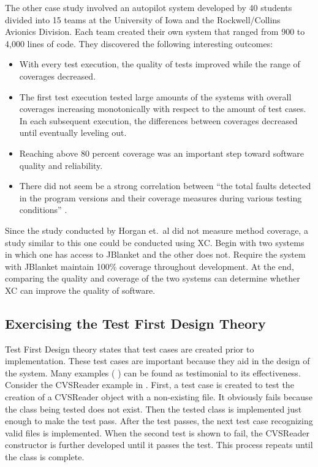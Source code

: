 The other case study involved an autopilot system developed by 40 students
divided into 15 teams at the University of Iowa and the Rockwell/Collins
Avionics Division.  Each team created their own system that ranged from 900
to 4,000 lines of code.  They discovered the following interesting
outcomes:
\begin{itemize}
\item With every test execution, the quality of tests improved while
the range of coverages decreased.
\item The first test execution tested large amounts of the systems
with overall coverages increasing monotonically with respect to the
amount of test cases.  In each subsequent execution, the differences
between coverages decreased until eventually leveling out.
\item Reaching above 80 percent coverage was an important step toward
software quality and reliability.
\item There did not seem be a strong correlation between ``the total
faults detected in the program versions and their coverage measures
during various testing conditions'' \cite{Horgan:1994}.
\end{itemize}

Since the study conducted by Horgan et.~al did not measure method
coverage, a study similar to this one could be conducted using XC.  Begin
with two systems in which one has access to JBlanket and the other does
not.  Require the system with JBlanket maintain 100\% coverage throughout
development.  At the end, comparing the quality and coverage of the two
systems can determine whether XC can improve the quality of software.

\subsection{Exercising the Test First Design Theory}
Test First Design theory states that test cases are created prior to
implementation.  These test cases are important because they aid in the
design of the system.  Many examples (\cite{Langr:2001}
\cite{RomanNumerals}) can be found as testimonial to its effectiveness.
Consider the CVSReader example in \cite{Langr:2001}.  First, a test case is
created to test the creation of a CVSReader object with a non-existing
file.  It obviously fails because the class being tested does not exist.
Then the tested class is implemented just enough to make the test pass.
After the test passes, the next test case recognizing valid files is
implemented.  When the second test is shown to fail, the CVSReader
constructor is further developed until it passes the test.  This process
repeats until the class is complete.


